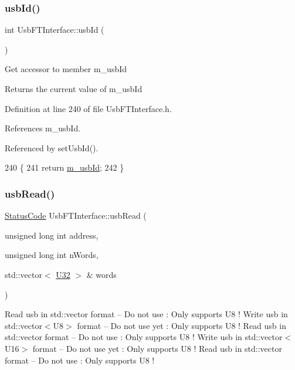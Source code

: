 \subsubsection{\texorpdfstring{usb\+Id()}{usbId()}}
{\footnotesize\ttfamily int Usb\+F\+T\+Interface\+::usb\+Id (\begin{DoxyParamCaption}{ }\end{DoxyParamCaption})\hspace{0.3cm}{\ttfamily [inline]}}

Get accessor to member m\+\_\+usb\+Id \begin{DoxyReturn}{Returns}
the current value of m\+\_\+usb\+Id 
\end{DoxyReturn}


Definition at line 240 of file Usb\+F\+T\+Interface.\+h.



References m\+\_\+usb\+Id.



Referenced by set\+Usb\+Id().


\begin{DoxyCode}
240                \{
241     \textcolor{keywordflow}{return} \hyperlink{classUsbFTInterface_a91df5c0547e8be460bc087e27afe05aa}{m\_usbId};
242   \}
\end{DoxyCode}
\mbox{\label{classUsbFTInterface_adb38dfafa3946dd373585e596851b6e6}} 
\subsubsection{\texorpdfstring{usb\+Read()}{usbRead()}}
{\footnotesize\ttfamily \hyperlink{classStatusCode}{Status\+Code} Usb\+F\+T\+Interface\+::usb\+Read (\begin{DoxyParamCaption}\item[{unsigned long int}]{address,  }\item[{unsigned long int}]{n\+Words,  }\item[{std\+::vector$<$ \hyperlink{classUsbFTInterface_aee2201fe4d977aa03568fa8dbacc39ba}{U32} $>$ \&}]{words }\end{DoxyParamCaption})}

Read usb in std\+::vector format -- Do not use \+: Only supports U8 ! Write usb in std\+::vector$<$\+U8$>$ format -- Do not use yet \+: Only supports U8 ! Read usb in std\+::vector format -- Do not use \+: Only supports U8 ! Write usb in std\+::vector$<$\+U16$>$ format -- Do not use yet \+: Only supports U8 ! Read usb in std\+::vector format -- Do not use \+: Only supports U8 ! 

